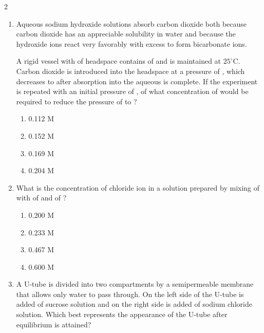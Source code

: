 \documentclass[10pt,letterpaper]{article}
\begin{document}
\begin{multicols*}{2}
\begin{enumerate}
    \item Aqueous sodium hydroxide solutions absorb carbon dioxide both because carbon dioxide has an appreciable solubility in water and because the hydroxide ions react very favorably with excess  to form bicarbonate ions.
    
    A rigid vessel with  of headspace contains  of   and is maintained at $25^\circ\text{C}$. Carbon dioxide is introduced into the headspace at a pressure of , which decreases to  after absorption into the aqueous  is complete. If the experiment is repeated with an initial  pressure of ,  of what concentration of  would be required to reduce the pressure of  to ?
    \begin{enumerate}[label=(\textsubscript{\Alph*})]
        \item 0.112 M
        \item 0.152 M
        \item 0.169 M
        \item 0.204 M
    \end{enumerate}

    \item What is the concentration of chloride ion in a solution prepared by mixing  of   with  of   and  of  ?
    \begin{enumerate}[label=(\textsubscript{\Alph*})]
        \item 0.200 M
        \item 0.233 M
        \item 0.467 M
        \item 0.600 M
    \end{enumerate}

    \item A U-tube is divided into two compartments by a semipermeable membrane that allows only water to pass through. On the left side of the U-tube is added  of  sucrose solution and on the right side is added  of  sodium chloride solution. Which best represents the appearance of the U-tube after equilibrium is attained?
    

\end{enumerate}
\end{multicols*}
\end{document}
